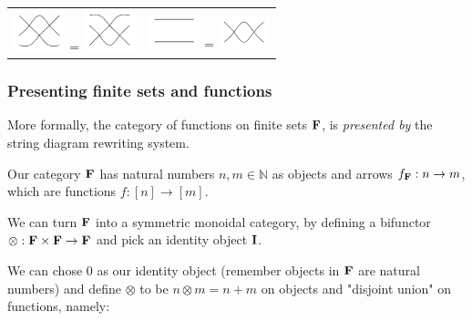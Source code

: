 \documentclass[t, pdftex]{beamer}
\begin{document}
\begin{frame}
\begin{table}[]
\begin{tabular}{cc}
            \includegraphics[valign=m, width=1.5cm]{figures/equations/e41.pdf} = 
            \includegraphics[valign=m, width=1.5cm]{figures/equations/e42.pdf} &
            \includegraphics[valign=m, width=1.5cm]{figures/equations/e71.pdf} = 
            \includegraphics[valign=m, width=1.5cm]{figures/equations/e72.pdf}

        \end{tabular}
    \end{table}
\end{frame}

\begin{frame}
    \frametitle{Presenting finite sets and functions}
    More formally, the category of functions on finite sets $\bf{F}$, is \textit{presented by} the string diagram rewriting system.
    \par
    Our category $\bf{F}$ has natural numbers $n,m \in \mathbb{N}$ as objects and arrows $f_{\bf{F}} : n \to m$, which are functions $f : [n] \to [m]$.
    \par
    We can turn $\bf{F}$ into a symmetric monoidal category, by defining a bifunctor $\otimes : \bf{F} \times \bf{F} \to \bf{F}$ and pick an identity object $\bf{I}$.
    \par
    We can chose $\mathrm{0}$ as our identity object (remember objects in $\bf{F}$ are natural numbers) and define $\otimes$ to be $n \otimes m = n + m$ on objects and "disjoint union" on functions, namely:
\end{frame}
\end{document}
